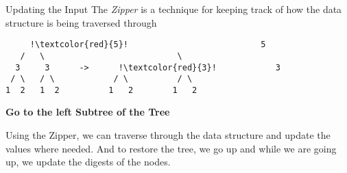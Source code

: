 \begin{slide}{Updating the Input}
The \textit{Zipper} is a technique for keeping track of how the data structure is being traversed through

\begin{center}
\begin{verbatim}
     !\textcolor{red}{5}!                           5     
   /   \                           \    
  3     3      ->      !\textcolor{red}{3}!            3    
 / \   / \            / \          / \  
1  2   1  2          1   2        1   2 
\end{verbatim}

\textbf{Go to the left Subtree of the Tree}
\end{center}

Using the Zipper, we can traverse through the data structure and update the values where needed. And to restore the tree, we go up and while we are going up, we update the digests of the nodes.
\end{slide}








